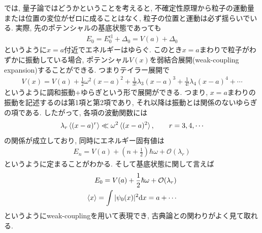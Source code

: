 \documentclass[dvipdfmx,11pt,a4paper,oneside,openany]{jsbook}
\begin{document}
では, 量子論ではどうかということを考えると, 不確定性原理から粒子の運動量または位置の変位がゼロに成ることはなく, 粒子の位置と運動は必ず揺らいでいる. 実際, 先のポテンシャルの基底状態であっても
\begin{align}
    E_0=E_{0}^{\text{cl}}+\Delta_0=V(a)+\Delta_0
\end{align}
というように$x=a$付近でエネルギーはゆらぐ. このとき$x=a$まわりで粒子がわずかに振動している場合, ポテンシャル$V(x)$を弱結合展開(weak-coupling expansion)することができる. つまりテイラー展開で
\begin{align}
    V(x)=V(a)+\frac{1}{2}\omega^2(x-a)^2+\frac{1}{3!}\lambda_3(x-a)^3+\frac{1}{4!}\lambda_4(x-a)^4+\cdots
\end{align}
というように調和振動+ゆらぎという形で展開ができる. つまり, $x=a$まわりの振動を記述するのは第1項と第2項であり, それ以降は振動とは関係のないゆらぎの項である. したがって, 各項の波動関数には
\begin{align}
    \lambda_r\braket{(x-a)^r} \ll \omega^2\braket{(x-a)^2}, \qquad r=3,4,\cdots
\end{align}
の関係が成立しており, 同時にエネルギー固有値は
\begin{align}
    E_n=V(a)+\left(n+\frac{1}{2}\right)\hbar\omega+\mathcal{O}(\lambda_r)
\end{align}
というように定まることがわかる. そして基底状態に関して言えば
\begin{align}
    E_0=V(a)+\frac{1}{2}\hbar\omega+\mathcal{O}(\lambda_r)\label{eq:5.9} \\
    \braket{x}=\int |\psi_0(x)|^2 \mathrm{d}x=a+\cdots
\end{align}
というようにweak-couplingを用いて表現でき, 古典論との関わりがよく見て取れる.
\end{document}

